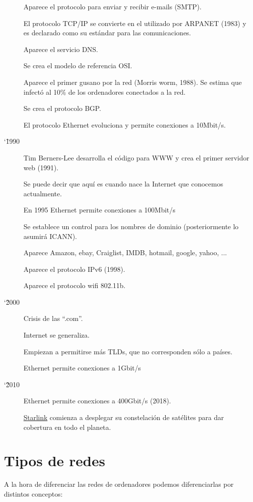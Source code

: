 \begin{description}
    Aparece el protocolo para enviar y recibir e-mails (SMTP).

    El protocolo TCP/IP se convierte en el utilizado por ARPANET (1983) y es declarado como su estándar para las comunicaciones.

    Aparece el servicio DNS.

    Se crea el modelo de referencia OSI.

    Aparece el primer gusano por la red (Morris worm, 1988). Se estima que infectó al 10\% de los ordenadores conectados a la red.

    Se crea el protocolo BGP.

    El protocolo Ethernet evoluciona y permite conexiones a 10Mbit/s.


    \item[\char`\~ 1990]
    Tim Berners-Lee desarrolla el código para WWW y crea el primer servidor web (1991).

    Se puede decir que aquí es cuando nace la Internet que conocemos actualmente.

    En 1995 Ethernet permite conexiones a 100Mbit/s

    Se establece un control para los nombres de dominio (posteriormente lo asumirá ICANN).

    Aparece Amazon, ebay, Craiglist, IMDB, hotmail, google, yahoo, ...

    Aparece el protocolo IPv6 (1998).

    Aparece el protocolo wifi 802.11b.

    \item[\char`\~ 2000]
    Crisis de las “.com”.

    Internet se generaliza.

    Empiezan a permitirse más TLDs, que no corresponden sólo a países.

    Ethernet permite conexiones a 1Gbit/s

    \item[\char`\~ 2010]
    Ethernet permite conexiones a 400Gbit/s (2018).

    \href{https://en.wikipedia.org/wiki/Starlink}{Starlink} comienza a desplegar su constelación de satélites para dar cobertura en todo el planeta.


\end{description}

\section{Tipos de redes}
A la hora de diferenciar las redes de ordenadores podemos diferenciarlas por distintos conceptos:

